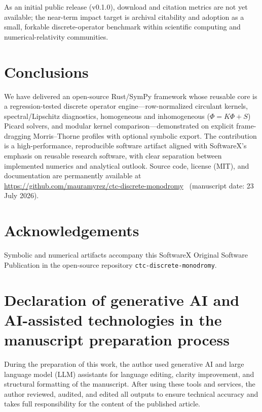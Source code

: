 \documentclass[preprint,12pt,a4paper]{elsarticle}
\newcommand{\manuscriptdate}{23 July 2026}
\begin{document}
As an initial public release (v0.1.0), download and citation metrics are not yet available; the near-term impact target is archival citability and adoption as a small, forkable discrete-operator benchmark within scientific computing and numerical-relativity communities.

\section{Conclusions}
\label{sec:conclusions}

We have delivered an open-source Rust/SymPy framework whose reusable core is a regression-tested discrete operator engine---row-normalized circulant kernels, spectral/Lipschitz diagnostics, homogeneous and inhomogeneous ($\Phi=K\Phi+S$) Picard solvers, and modular kernel comparison---demonstrated on explicit frame-dragging Morris--Thorne profiles with optional symbolic export.
The contribution is a high-performance, reproducible software artifact aligned with SoftwareX's emphasis on reusable research software, with clear separation between implemented numerics and analytical outlook.
Source code, license (MIT), and documentation are permanently available at
\url{https://github.com/mauramyrez/ctc-discrete-monodromy}~\cite{PaniaguaRamirez2026CTC}
(manuscript date: \manuscriptdate).

\section*{Acknowledgements}
\label{sec:ack}
Symbolic and numerical artifacts accompany this SoftwareX Original Software Publication in the open-source repository \texttt{ctc-discrete-monodromy}.

\section*{Declaration of generative AI and AI-assisted technologies in the manuscript preparation process}
\label{sec:ai-declaration}
During the preparation of this work, the author used generative AI and large language model (LLM) assistants for language editing, clarity improvement, and structural formatting of the manuscript.
After using these tools and services, the author reviewed, audited, and edited all outputs to ensure technical accuracy and takes full responsibility for the content of the published article.



\end{document}
